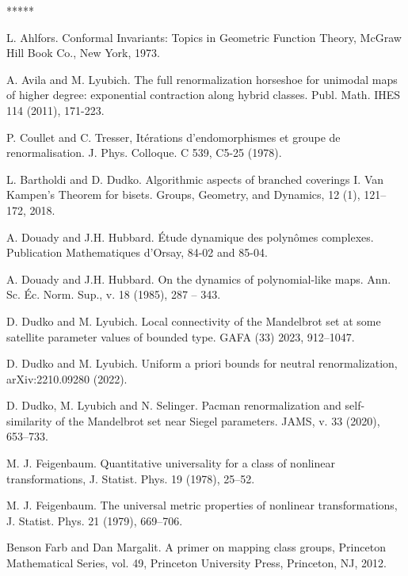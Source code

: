 \documentclass{amsart}
\newcommand{\1}{{\mathbb 1 }}
\begin{document}
\begin{thebibliography}{*****}



 L. Ahlfors. Conformal Invariants: Topics in Geometric Function Theory, McGraw Hill Book Co., New York, 1973.

 A. Avila and M. Lyubich.
  The full renormalization horseshoe for unimodal maps of higher
  degree: exponential contraction along hybrid classes.
Publ. Math. IHES 114 (2011), 171-223. 


 P. Coullet and C. Tresser, It\'erations d’endomorphismes et groupe de renormalisation.  J. Phys. Colloque. C 539, C5-25 (1978).





 L. Bartholdi and D. Dudko. Algorithmic aspects of branched coverings I. Van Kampen's Theorem for bisets. Groups, Geometry, and Dynamics, 12 (1), 121--172, 2018.

 A. Douady and J.H. Hubbard. 
  \'{E}tude dynamique des polyn\^{o}mes complexes.
 Publication Mathematiques d'Orsay,
84-02 and 85-04.

 A. Douady and J.H. Hubbard. On the dynamics of polynomial-like maps.
 Ann. Sc. \'{E}c. Norm. Sup., v. 18 (1985), 287 -- 343.

 D. Dudko and M. Lyubich.
   Local connectivity of the Mandelbrot set at some satellite
    parameter values of bounded type. GAFA (33) 2023, 912--1047. 
    
 D. Dudko and M. Lyubich. Uniform a priori bounds for neutral renormalization,  arXiv:2210.09280 (2022).
    
   D. Dudko, M. Lyubich and N. Selinger.
  Pacman renormalization and self-similarity of the Mandelbrot set
  near Siegel parameters.  JAMS,   v. 33 (2020), 653--733.
  
  
 M. J. Feigenbaum. Quantitative universality for a class of nonlinear transformations, J. Statist. Phys. 19 (1978), 25–52.

  M. J. Feigenbaum. The universal metric properties of nonlinear transformations, J. Statist. Phys. 21 (1979), 669–706.

  Benson Farb and Dan Margalit. A primer on mapping class groups, Princeton Mathematical Series, vol. 49, Princeton University Press, Princeton, NJ, 2012. 
   

\end{thebibliography}
\end{document}
